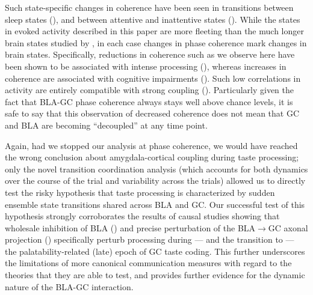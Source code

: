 \begin{refsection}
Such state-specific changes in coherence have been seen in transitions between sleep states (\cite{stitt2017a}), and between attentive and inattentive states (\cite{siegel2008a}). While the states in evoked activity described in this paper are more fleeting than the much longer brain states studied by \cite{stitt2017a,siegel2008a}, in each case changes in phase coherence mark changes in brain states. Specifically, reductions in coherence such as we observe here have been shown to be associated with intense processing (\cite{supp2011a}), whereas increases in coherence are associated with cognitive impairments (\cite{martinet2017a,arbab2018a}). Such low correlations in activity are entirely compatible with strong coupling (\cite{schneidman2006a}). Particularly given the fact that BLA-GC phase coherence always stays well above chance levels, it is safe to say that this observation of decreased coherence does not mean that GC and BLA are becoming “decoupled” at any time point. 

Again, had we stopped our analysis at phase coherence, we would have reached the wrong conclusion about amygdala-cortical coupling during taste processing; only the novel transition coordination analysis (which accounts for both dynamics over the course of the trial and variability across the trials) allowed us to directly test the risky hypothesis that taste processing is characterized by sudden ensemble state transitions shared across BLA and GC. Our successful test of this hypothesis strongly corroborates the results of causal studies showing that wholesale inhibition of BLA (\cite{piette2012a}) and precise perturbation of the BLA$\rightarrow$GC axonal projection (\cite{lin2021a}) specifically perturb processing during --- and the transition to --- the palatability-related (late) epoch of GC taste coding. This further underscores the limitations of more canonical communication measures with regard to the theories that they are able to test, and provides further evidence for the dynamic nature of the BLA-GC interaction.


\end{refsection}
